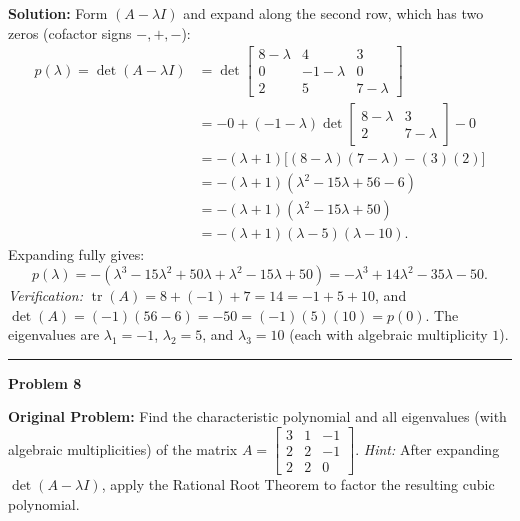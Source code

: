 \documentclass[11pt, letterpaper]{article}
\theoremstyle{definition}
\theoremstyle{remark}
\begin{document}
\textbf{Solution:} Form $(A - \lambda I)$ and expand along the second row, which has two zeros (cofactor signs $-, +, -$):
\begin{align*}
p(\lambda) = \det(A - \lambda I) &= \det\begin{bmatrix} 8 - \lambda & 4 & 3 \\ 0 & -1 - \lambda & 0 \\ 2 & 5 & 7 - \lambda \end{bmatrix} \\
&= -0 + (-1 - \lambda)\det\begin{bmatrix} 8 - \lambda & 3 \\ 2 & 7 - \lambda \end{bmatrix} - 0 \\
&= -(\lambda + 1)\big[(8 - \lambda)(7 - \lambda) - (3)(2)\big] \\
&= -(\lambda + 1)(\lambda^2 - 15\lambda + 56 - 6) \\
&= -(\lambda + 1)(\lambda^2 - 15\lambda + 50) \\
&= -(\lambda + 1)(\lambda - 5)(\lambda - 10).
\end{align*}
Expanding fully gives:
\[
p(\lambda) = -(\lambda^3 - 15\lambda^2 + 50\lambda + \lambda^2 - 15\lambda + 50) = -\lambda^3 + 14\lambda^2 - 35\lambda - 50.
\]
\textit{Verification:} $\operatorname{tr}(A) = 8 + (-1) + 7 = 14 = -1 + 5 + 10$, and $\det(A) = (-1)(56 - 6) = -50 = (-1)(5)(10) = p(0)$.
The eigenvalues are $\lambda_1 = -1$, $\lambda_2 = 5$, and $\lambda_3 = 10$ (each with algebraic multiplicity $1$).

\noindent\rule{\textwidth}{0.4pt}

\noindent\textbf{Problem 8}

\textbf{Original Problem:} Find the characteristic polynomial and all eigenvalues (with algebraic multiplicities) of the matrix $A = \begin{bmatrix} 3 & 1 & -1 \\ 2 & 2 & -1 \\ 2 & 2 & 0 \end{bmatrix}$. \textit{Hint:} After expanding $\det(A - \lambda I)$, apply the Rational Root Theorem to factor the resulting cubic polynomial.
\end{document}
